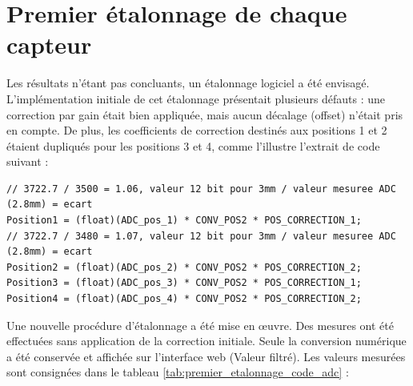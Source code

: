 \section{Premier étalonnage de chaque capteur}
Les résultats n'étant pas concluants, un étalonnage logiciel a été envisagé. L'implémentation initiale de cet étalonnage présentait plusieurs défauts : une correction par gain était bien appliquée, mais aucun décalage (offset) n'était pris en compte. De plus, les coefficients de correction destinés aux positions 1 et 2 étaient dupliqués pour les positions 3 et 4, comme l'illustre l'extrait de code suivant :

\begin{verbatim}
// 3722.7 / 3500 = 1.06, valeur 12 bit pour 3mm / valeur mesuree ADC (2.8mm) = ecart
Position1 = (float)(ADC_pos_1) * CONV_POS2 * POS_CORRECTION_1;
// 3722.7 / 3480 = 1.07, valeur 12 bit pour 3mm / valeur mesuree ADC (2.8mm) = ecart
Position2 = (float)(ADC_pos_2) * CONV_POS2 * POS_CORRECTION_2;
Position3 = (float)(ADC_pos_3) * CONV_POS2 * POS_CORRECTION_1;
Position4 = (float)(ADC_pos_4) * CONV_POS2 * POS_CORRECTION_2;
\end{verbatim}

Une nouvelle procédure d'étalonnage a été mise en œuvre. Des mesures ont été effectuées sans application de la correction initiale. Seule la conversion numérique a été conservée et affichée sur l'interface web (Valeur filtré). Les valeurs mesurées sont consignées dans le tableau \ref{tab:premier_etalonnage_code_adc} :

